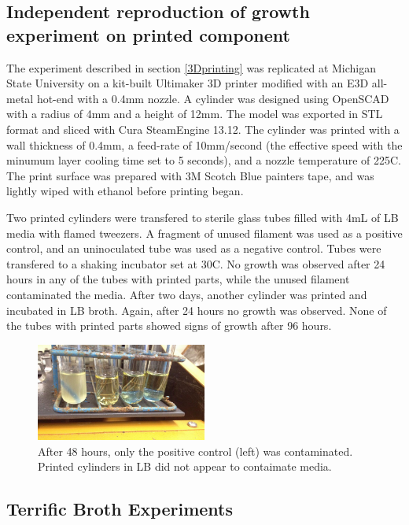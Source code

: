\documentclass[fleqn,10pt]{wlpeerj}
\begin{document}
\begin{figure}
    \label{fig:3Dparts}
\end{figure}

\subsection{Independent reproduction of growth experiment on printed component}

The experiment described in section \ref{3Dprinting} was replicated at Michigan State University on a kit-built Ultimaker 3D printer modified with an E3D all-metal hot-end with a 0.4mm nozzle. A cylinder was designed using OpenSCAD with a radius of 4mm and a height of 12mm. The model was exported in STL format and sliced with Cura SteamEngine 13.12. The cylinder was printed with a wall thickness of 0.4mm, a feed-rate of 10mm/second (the effective speed with the minumum layer cooling time set to 5 seconds), and a nozzle temperature of 225C. The print surface was prepared with 3M Scotch Blue painters tape, and was lightly wiped with ethanol before printing began.

Two printed cylinders were transfered to sterile glass tubes filled with 4mL of LB media with flamed tweezers. A fragment of unused filament was used as a positive control, and an uninoculated tube was used as a negative control. Tubes were transfered to a shaking incubator set at 30C. No growth was observed after 24 hours in any of the tubes with printed parts, while the unused filament contaminated the media. After two days, another cylinder was printed and incubated in LB broth. Again, after 24 hours no growth was observed. None of the tubes with printed parts showed signs of growth after 96 hours.

\begin{figure}[h!]
  \centering
    \includegraphics[width=0.5\textwidth]{sterile_print_zaman}
    \caption{After 48 hours, only the positive control (left) was contaminated. Printed cylinders in LB did not appear to contaimate media.}
\end{figure}

\subsection{Terrific Broth Experiments}
\end{document}
